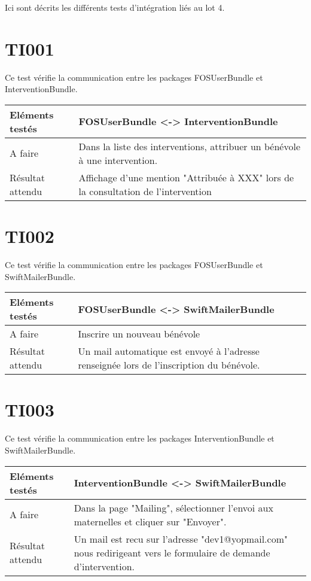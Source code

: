 
Ici sont décrits les différents tests d'intégration liés au lot 4.

\section{TI001}
	 Ce test vérifie la communication entre les packages FOSUserBundle et InterventionBundle.
	 \begin{center}
     	\begin{tabular}[h]{|p{}|p{}|}
		\hline
			Eléments testés & FOSUserBundle <-> InterventionBundle \\\hline
    			A faire & Dans la liste des interventions, attribuer un bénévole à une intervention. \\\hline
    			Résultat attendu & Affichage d'une mention "Attribuée à XXX" lors de la consultation de l'intervention \\\hline
     	\end{tabular}
  	\end{center}	
  	
\section{TI002}
	 Ce test vérifie la communication entre les packages FOSUserBundle et SwiftMailerBundle.
	 \begin{center}
     	\begin{tabular}[h]{|p{}|p{}|}
		\hline
			Eléments testés & FOSUserBundle <-> SwiftMailerBundle \\\hline
    			A faire & Inscrire un nouveau bénévole \\\hline
    			Résultat attendu & Un mail automatique est envoyé à l'adresse renseignée lors de l'inscription du bénévole. \\\hline
     	\end{tabular}
  	\end{center}	
  	
  	
 \section{TI003}
	 Ce test vérifie la communication entre les packages InterventionBundle et SwiftMailerBundle.
	 \begin{center}
     	\begin{tabular}[h]{|p{}|p{}|}
		\hline
			Eléments testés & InterventionBundle <-> SwiftMailerBundle \\\hline
    			A faire & Dans la page "Mailing", sélectionner l'envoi aux maternelles et cliquer sur "Envoyer". \\\hline
    			Résultat attendu & Un mail est recu sur l'adresse "dev1@yopmail.com" nous redirigeant vers le formulaire de demande d'intervention. \\\hline
     	\end{tabular}
  	\end{center}		
